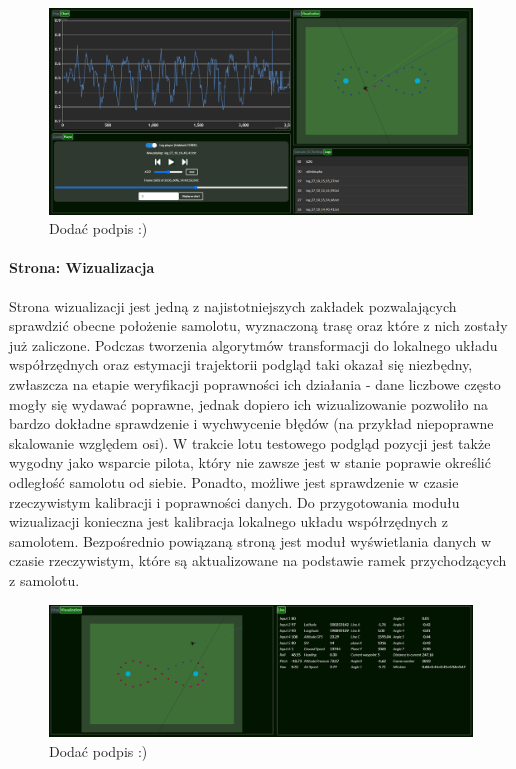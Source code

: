 \documentclass[12pt, a4paper]{article}
\begin{document}
 \begin{figure}[ht]
    \centering
    \includegraphics[width=1\textwidth]{polocie}
    \caption{Dodać podpis :)}
\end{figure}

\FloatBarrier
 
\paragraph{Strona: Wizualizacja}\mbox{}

Strona wizualizacji jest jedną z najistotniejszych zakładek pozwalających sprawdzić obecne położenie samolotu, wyznaczoną trasę oraz które z nich zostały już zaliczone. Podczas tworzenia algorytmów transformacji do lokalnego układu współrzędnych oraz estymacji trajektorii podgląd taki okazał się niezbędny, zwłaszcza na etapie weryfikacji poprawności ich działania - dane liczbowe często mogły się wydawać poprawne, jednak dopiero ich wizualizowanie pozwoliło na bardzo dokładne sprawdzenie i wychwycenie błędów (na przykład niepoprawne skalowanie względem osi). W trakcie lotu testowego podgląd pozycji jest także wygodny jako wsparcie pilota, który nie zawsze jest w stanie poprawie określić odległość samolotu od siebie. Ponadto, możliwe jest sprawdzenie w czasie rzeczywistym kalibracji i poprawności danych. Do przygotowania modułu wizualizacji konieczna jest kalibracja lokalnego układu współrzędnych z samolotem. Bezpośrednio powiązaną stroną jest moduł wyświetlania danych w czasie rzeczywistym, które są aktualizowane na podstawie ramek przychodzących z samolotu.

 \begin{figure}[H]
    \centering
    \includegraphics[width=1\textwidth]{wizualizacja}
    \caption{Dodać podpis :)}
\end{figure}
\end{document}
